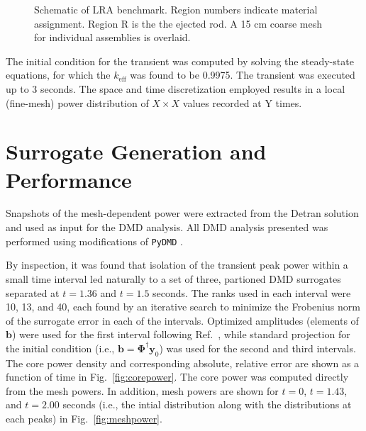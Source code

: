\documentclass{anstrans}
\begin{document}
\begin{figure}
\caption{Schematic of LRA benchmark.  Region numbers indicate material assignment.  Region R is the the ejected rod.  A 15 cm coarse mesh for individual assemblies is overlaid.}
\label{fig:lra_core}
\end{figure}

The initial condition for the transient was computed by solving the steady-state equations, for which the $k_{\text{eff}}$ was found to be 0.9975.
The transient was executed up to 3 seconds.
The space and time discretization employed results in a local (fine-mesh) power distribution of $X \times X$ values recorded at Y times.


\section{Surrogate Generation and Performance}

Snapshots of the mesh-dependent power were extracted from the Detran solution and used as input for the DMD analysis. All DMD analysis presented was performed using modifications of {\tt PyDMD} \cite{demo2018pydmd}.
 
By inspection, it was found that isolation of the transient peak power within a small time interval led naturally to a set of three, partioned DMD surrogates separated at $t = 1.36$ and $t = 1.5$ seconds.  The ranks used in each interval were 10, 13, and 40, each found by an iterative search to minimize the Frobenius norm of the surrogate error in each of the intervals.  Optimized amplitudes (elements of $\mathbf{b}$) were used for the first interval following Ref.~\cite{jovanovic2014sparsity}, while standard projection for the initial condition (i.e., $\mathbf{b}=\bm{\Phi}^{\dagger} \mathbf{y}_0$) was used for the second and third intervals.    The core power density and corresponding absolute, relative error are shown as a function of time in Fig.~\ref{fig:corepower}.  The core power was computed directly from the mesh powers. In addition, mesh powers are shown for $t=0$, $t=1.43$, and $t=2.00$ seconds (i.e., the intial distribution along with the distributions at each peaks) in Fig.~\ref{fig:meshpower}.  
\end{document}
